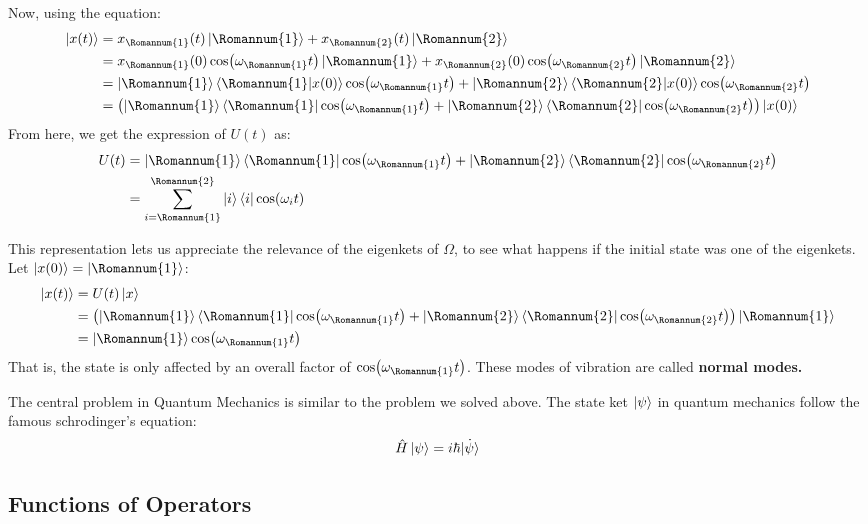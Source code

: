 \documentclass[12pt,a4paper]{report}
\newcommand{\rom}[1]{\Romannum{#1}}
\begin{document}
Now, using the equation:
\begin{align*}
    \ket{x(t)} &= x_\rom{1}(t) \ket{\rom{1}} + x_\rom{2}(t) \ket{\rom{2}} \\
        &= x_\rom{1}(0)\cos(\omega_\rom{1}t) \ket{\rom{1}} + x_\rom{2}(0)\cos(\omega_\rom{2}t) \ket{\rom{2}} \\
        &= \ket{\rom{1}} \bra{\rom{1}}\ket{x(0)}\cos(\omega_\rom{1}t) + \ket{\rom{2}} \bra{\rom{2}}\ket{x(0)}\cos(\omega_\rom{2}t) \\
        &= \left(\ket{\rom{1}} \bra{\rom{1}}\cos(\omega_\rom{1}t) + \ket{\rom{2}} \bra{\rom{2}}\cos(\omega_\rom{2}t)\right) \ket{x(0)}
\end{align*}
From here, we get the expression of $U(t)$ as:
\begin{align*}
    U(t) &= \ket{\rom{1}} \bra{\rom{1}}\cos(\omega_\rom{1}t) + \ket{\rom{2}} \bra{\rom{2}}\cos(\omega_\rom{2}t) \\
    &= \sum_{i=\rom{1}}^\rom{2}\ket{i} \bra{i}\cos(\omega_it)
\end{align*}

This representation lets us appreciate the relevance of the eigenkets of $\Omega$, to see what happens if the initial state was one of the eigenkets. Let $\ket{x(0)} = \ket{\rom{1}}$:
\begin{align*}
    \ket{x(t)} &= U(t)\ket{x} \\
    &= \left( \ket{\rom{1}} \bra{\rom{1}}\cos(\omega_\rom{1}t) + \ket{\rom{2}} \bra{\rom{2}}\cos(\omega_\rom{2}t)\right) \ket{\rom{1}} \\
    &= \ket{\rom{1}}\cos(\omega_\rom{1}t)
\end{align*}
That is, the state is only affected by an overall factor of $\cos(\omega_\rom{1}t)$. These modes of vibration are called \textbf{normal modes.}

The central problem in Quantum Mechanics is similar to the problem we solved above. The state ket $\ket{\psi}$ in quantum mechanics follow the famous schrodinger's equation:
\begin{equation*}
    \hat{H} \ket{\psi} = i\hbar\dot{\ket{\psi}}
\end{equation*}

\subsection{Functions of Operators}
\end{document}
